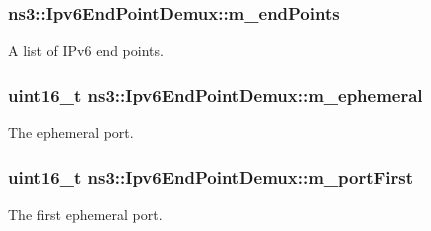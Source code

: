 \subsubsection[{\texorpdfstring{m\+\_\+end\+Points}{m_endPoints}}]{ ns3\+::\+Ipv6\+End\+Point\+Demux\+::m\+\_\+end\+Points\hspace{0.3cm}{\ttfamily [private]}}\hypertarget{classns3_1_1Ipv6EndPointDemux_a426db7bf82f46d87aa92afa3c3b927d9}{}\label{classns3_1_1Ipv6EndPointDemux_a426db7bf82f46d87aa92afa3c3b927d9}


A list of I\+Pv6 end points. 

\subsubsection[{\texorpdfstring{m\+\_\+ephemeral}{m_ephemeral}}]{\setlength{\rightskip}{0pt plus 5cm}uint16\+\_\+t ns3\+::\+Ipv6\+End\+Point\+Demux\+::m\+\_\+ephemeral\hspace{0.3cm}{\ttfamily [private]}}\hypertarget{classns3_1_1Ipv6EndPointDemux_a45092d502f845f3475ad5680ed4c8b27}{}\label{classns3_1_1Ipv6EndPointDemux_a45092d502f845f3475ad5680ed4c8b27}


The ephemeral port. 

\subsubsection[{\texorpdfstring{m\+\_\+port\+First}{m_portFirst}}]{\setlength{\rightskip}{0pt plus 5cm}uint16\+\_\+t ns3\+::\+Ipv6\+End\+Point\+Demux\+::m\+\_\+port\+First\hspace{0.3cm}{\ttfamily [private]}}\hypertarget{classns3_1_1Ipv6EndPointDemux_acc166562bc620f3859085abc423b4c35}{}\label{classns3_1_1Ipv6EndPointDemux_acc166562bc620f3859085abc423b4c35}


The first ephemeral port. 

